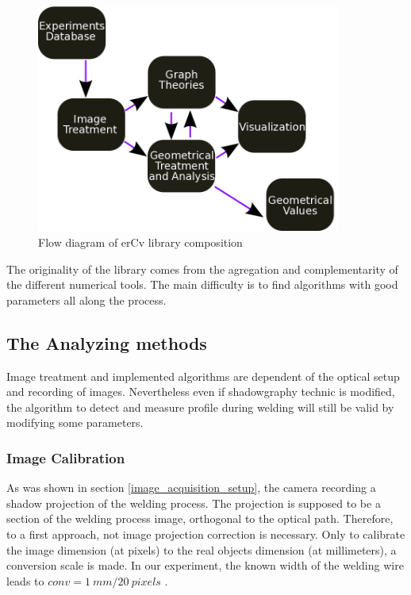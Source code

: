 \documentclass[12pt]{iopart}
\begin{document}
\begin{figure}
\begin{center}
\includegraphics[width=10cm]{images/schema-erCv.png}
\caption{{\small Flow diagram of erCv library composition}}
\label{fig::schema-erCv}
\end{center}
\end{figure}

The originality of the library comes from the agregation 
and complementarity of the different numerical tools.
The main difficulty is to find algorithms with good parameters all along the process.

\subsection{ The Analyzing methods}
\label{ the_analyze_methods}
Image treatment and implemented algorithms are dependent of the optical setup and recording of images.
Nevertheless even if shadowgraphy technic is modified, the algorithm to detect and measure profile during
welding will still be valid by modifying some parameters.

\subsubsection{ Image Calibration}
\label{ image_calibration}

As was shown in section \ref{image_acquisition_setup}, the camera recording a 
shadow projection of the welding process. The projection is 
supposed to be a section of the welding process image, orthogonal to the optical path.
Therefore, to a first approach, not image projection 
correction is necessary. Only to calibrate the image dimension 
(at pixels) to the real objects dimension (at millimeters), a conversion scale is 
made. In our experiment, the known width of the welding wire leads to $conv = 1\ mm/ 20\ pixels$ . 
  
\end{document}
